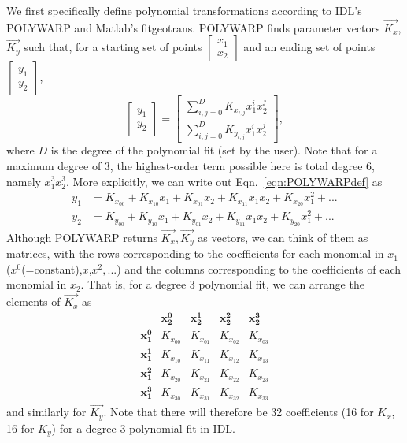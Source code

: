 \documentclass[11pt]{article}
\begin{document}
We first specifically define polynomial transformations according to IDL's POLYWARP and Matlab's fitgeotrans.  POLYWARP finds parameter vectors $\vec{K_x}$, $\vec{K_y}$ such that, for a starting set of points $\left[\begin{smallmatrix} x_1\\ x_2\end{smallmatrix} \right]$ and an ending set of points $\left[\begin{smallmatrix} y_1\\ y_2\end{smallmatrix} \right]$,
\begin{equation}
       \left[   \begin{matrix} 
          y_1 \\
          y_2
          \end{matrix} \right] = \left[ \begin{matrix}
          			\sum_{i,j=0}^D K_{x_{i,j}} x_1^ix_2^j\\
				\sum_{i,j=0}^D K_{y_{i,j}} x_1^ix_2^j
				 \end{matrix} \right], \label{eqn:POLYWARPdef}
\end{equation}
where $D$ is the degree of the polynomial fit (set by the user). Note that for a maximum degree of 3, the highest-order term possible here is total degree 6, namely $x_1^3x_2^3$.  More explicitly, we can write out Eqn.~\eqref{eqn:POLYWARPdef} as 
\begin{align}
y_1 &= K_{x_{00}} + K_{x_{10}}x_1+K_{x_{01}}x_2+K_{x_{11}}x_1x_2+K_{x_{20}}x_1^2+...\\
y_2 &= K_{y_{00}} + K_{y_{10}}x_1+K_{y_{01}}x_2+K_{y_{11}}x_1x_2+K_{y_{20}}x_1^2+...
\end{align}
Although POLYWARP returns $\vec{K_x},\vec{K_y}$ as vectors, we can think of them as matrices, with the rows corresponding to the coefficients for each monomial in $x_1$ ($x^0$(=constant),$x$,$x^2,...$) and the columns corresponding to the coefficients of each monomial in $x_2$.  That is, for a degree 3 polynomial fit, we can arrange the elements of $\vec{K_x}$ as
\begin{equation}
 \begin{matrix} 
            & \mathbf{x_2^0}         & \mathbf{x_2^1} & \mathbf{x_2^2}  & \mathbf{x_2^3} \\
\mathbf{x_1^0} & K_{x_{00}} & K_{x_{01}} & K_{x_{02}} & K_{x_{03}} \\
\mathbf{x_1^1} & K_{x_{10}} & K_{x_{11}} & K_{x_{12}} & K_{x_{13}} \\
\mathbf{x_1^2} & K_{x_{20}} & K_{x_{21}} & K_{x_{22}} & K_{x_{23}} \\
\mathbf{x_1^3} & K_{x_{30}} & K_{x_{31}} & K_{x_{32}} & K_{x_{33}}
\end{matrix} 
\end{equation}
and similarly for $\vec{K_y}$.  Note that there will therefore be 32 coefficients (16 for $K_x$, 16 for $K_y$) for a degree 3 polynomial fit in IDL.
\end{document}
